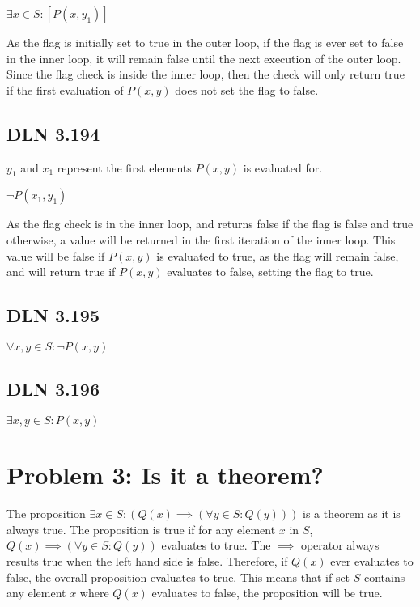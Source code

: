 \documentclass[titlepage]{article}
\begin{document}
\( \exists x \in S: [P(x, y_1)] \) 

As the flag is initially set to true in the outer loop, if the flag is ever set to false in the inner loop, it will remain false until the next execution of the outer loop. Since the flag check is inside the inner loop, then the check will only return true if the first evaluation of $P(x,y)$ does not set the flag to false. 

\subsection{DLN 3.194}

$y_1$ and $x_1$ represent the first elements $P(x,y)$ is evaluated for.

\( \lnot P(x_1,y_1) \)

As the flag check is in the inner loop, and returns false if the flag is false and true otherwise, a value will be returned in the first iteration of the inner loop. This value will be false if $P(x,y)$ is evaluated to true, as the flag will remain false, and will return true if $P(x,y)$ evaluates to false, setting the flag to true. 

\subsection{DLN 3.195}

\( \forall x, y \in S: \lnot P(x,y)\)

\subsection{DLN 3.196} 

\( \exists x, y \in S: P(x,y) \)

\section{Problem 3: Is it a theorem?}

The proposition $\exists x \in S: \left( Q(x) \implies \left( \forall y \in S: Q(y) \right)\right)$ is a theorem as it is always true. The proposition is true if for any element $x$ in $S$, $Q(x) \implies ( \forall y \in S: Q(y))$ evaluates to true. The $\implies$ operator always results true when the left hand side is false. Therefore, if $Q(x)$ ever evaluates to false, the overall proposition evaluates to true. This means that if set $S$ contains any element $x$ where $Q(x)$ evaluates to false, the proposition will be true.
\end{document}
